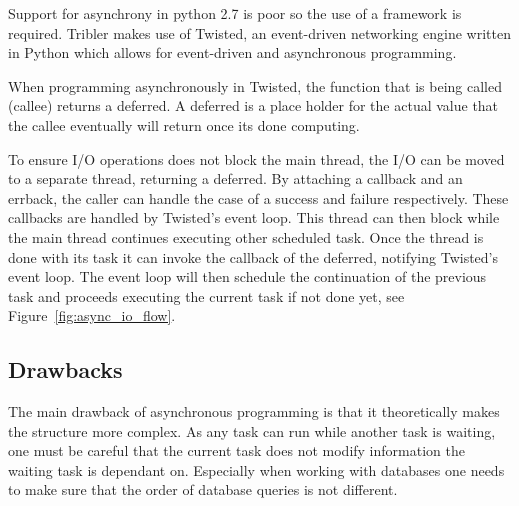 Support for asynchrony in python 2.7 is poor so the use of a framework is required.
Tribler makes use of Twisted, an event-driven networking engine written in Python  which allows for event-driven and asynchronous programming.



When programming asynchronously in Twisted, the function that is being called (callee) returns a deferred.
A deferred is a place holder for the actual value that the callee eventually will return once its done computing.

To ensure I/O operations does not block the main thread, the I/O can be moved to a separate thread, returning a deferred.
By attaching a callback and an errback, the caller can handle the case of a success and failure respectively.
These callbacks are handled by Twisted's event loop.
This thread can then block while the main thread continues executing other scheduled task.
Once the thread is done with its task it can invoke the callback of the deferred, notifying Twisted's event loop.
The event loop will then schedule the continuation of the previous task and proceeds executing the current task if not done yet, see Figure~\ref{fig:async_io_flow}.

\subsection{Drawbacks}

The main drawback of asynchronous programming is that it theoretically makes the structure more complex.
As any task can run while another task is waiting, one must be careful that the current task does not modify information the waiting task is dependant on.
Especially when working with databases one needs to make sure that the order of database queries is not different.

